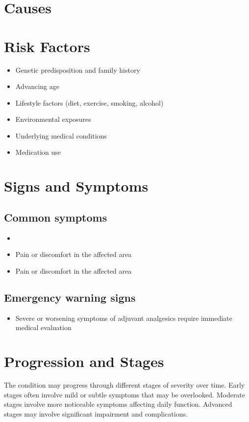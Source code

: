 \section{Causes}
\section{Risk Factors}

\begin{itemize}[noitemsep]
  \item Genetic predisposition and family history
  \item Advancing age
  \item Lifestyle factors (diet, exercise, smoking, alcohol)
  \item Environmental exposures
  \item Underlying medical conditions
  \item Medication use
\end{itemize}
\section{Signs and Symptoms}

\subsection{Common symptoms}
\begin{itemize}[noitemsep]
  \item \item Pain or discomfort in the affected area    \item Pain or discomfort in the affected area
  \end{itemize}

\subsection{Emergency warning signs}
\begin{itemize}[noitemsep]
  \item Severe or worsening symptoms of adjuvant analgesics require immediate medical evaluation
\end{itemize}
\section{Progression and Stages}
The condition may progress through different stages of severity over time. Early stages often involve mild or subtle symptoms that may be overlooked. Moderate stages involve more noticeable symptoms affecting daily function. Advanced stages may involve significant impairment and complications.

